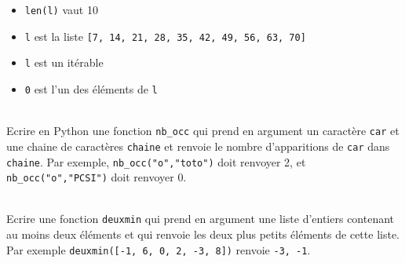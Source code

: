 \documentclass[11pt,a4paper]{article}
\begin{document}
\begin{Exercise}[title={QCM}]
\begin{tabularx}{\linewidth}{@{}XXXX@{}}
	\end{tabularx}
    \begin{itemize}
    \item[\gc] {\tt len(l)} vaut 10 
    \item[\bc] {\tt l} est la liste {\tt [7, 14, 21, 28, 35, 42, 49, 56, 63, 70]} 
    \item[\gc] {\tt l} est un itérable
    \item[\gc] {\tt 0} est l'un des éléments de {\tt l} 
    \end{itemize}
\end{Exercise}

\begin{Exercise}[title = {Définir une fonction}]\\
    Ecrire en Python une fonction {\tt nb\_occ} qui prend en argument un caractère {\tt car} et une chaine de caractères {\tt chaine} et renvoie le nombre d'apparitions de  {\tt car} dans {\tt chaine}. Par exemple, {\tt nb\_occ("o","toto")} doit renvoyer 2, et {\tt nb\_occ("o","PCSI")} doit renvoyer 0.
	\ifcorrige
	\fi
\end{Exercise}


\begin{Exercise}[title = {Exercice bonus}]\\
	Ecrire une fonction {\tt deuxmin} qui prend en argument une liste d'entiers contenant au moins deux éléments et qui renvoie les deux plus petits éléments de cette liste. Par exemple {\tt deuxmin([-1, 6, 0, 2, -3, 8])} renvoie {\tt -3, -1}.
\end{Exercise}
\end{document}
